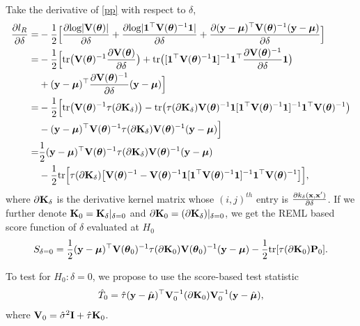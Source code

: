 \documentclass[article]{jss}
\begin{document}
\begin{appendix}
Take the derivative of \eqref{pp} with respect to $\delta$,
\begin{align}
\frac{\partial l_R}{\partial \delta}=&-\frac{1}{2}\Big[\frac{\partial \mbox{log}| {\bf V}(\boldsymbol{\theta}) |}{\partial \delta}+\frac{\partial \mbox{log} | \mathbf{1}^\top {\bf V}(\boldsymbol{\theta})^{-1}\mathbf{1} |}{\partial \delta}+ \frac{\partial ({\bf y}-\boldsymbol{\mu})^\top {\bf V}(\boldsymbol{\theta})^{-1}({\bf y}-\boldsymbol{\mu})}{\partial \delta}\Big]\nonumber \\
=&-\frac{1}{2}\Big[\mbox{tr}\big({\bf V}(\boldsymbol{\theta})^{-1}\frac{\partial {\bf V}(\boldsymbol{\theta})}{\partial \delta}\big)+\mbox{tr}\big([\mathbf{1}^\top {\bf V}(\boldsymbol{\theta})^{-1}\mathbf{1}]^{-1}\mathbf{1}^\top \frac{\partial {\bf V}(\boldsymbol{\theta})^{-1}}{\partial \delta}\mathbf{1}\big)\nonumber \\
&+({\bf y}-\boldsymbol{\mu})^\top \frac{\partial {\bf V}(\boldsymbol{\theta})^{-1}}{\partial \delta}({\bf y}-\boldsymbol{\mu}) \Big]\nonumber \\
=&-\frac{1}{2}\Big[\mbox{tr}\big({\bf V}(\boldsymbol{\theta})^{-1}\tau (\partial {\bf K}_\delta)\big)-\mbox{tr}\big(\tau (\partial {\bf K}_\delta){\bf V}(\boldsymbol{\theta})^{-1}\mathbf{1}[\mathbf{1}^\top {\bf V}(\boldsymbol{\theta})^{-1}\mathbf{1}]^{-1}\mathbf{1}^\top {\bf V}(\boldsymbol{\theta})^{-1}\big)\nonumber \\
&-({\bf y}-\boldsymbol{\mu})^\top {\bf V}(\boldsymbol{\theta})^{-1}\tau (\partial {\bf K}_\delta){\bf V}(\boldsymbol{\theta})^{-1}({\bf y}-\boldsymbol{\mu}) \Big]\nonumber \\
=&\frac{1}{2}({\bf y}-\boldsymbol{\mu})^\top {\bf V}(\boldsymbol{\theta})^{-1}\tau (\partial {\bf K}_\delta){\bf V}(\boldsymbol{\theta})^{-1}({\bf y}-\boldsymbol{\mu})\nonumber \\
&-\frac{1}{2}\mbox{tr}\Big[\tau (\partial {\bf K}_\delta)\big[{\bf V}(\boldsymbol{\theta})^{-1}-{\bf V}(\boldsymbol{\theta})^{-1}\mathbf{1}[\mathbf{1}^\top {\bf V}(\boldsymbol{\theta})^{-1}\mathbf{1} ]^{-1}\mathbf{1}^\top {\bf V}(\boldsymbol{\theta})^{-1}\big]\Big], \label{qq}
\end{align}
where $\partial {\bf K}_\delta$ is the derivative kernel matrix whose $(i,j)^{th}$ entry is $\frac{\partial k_\delta({\bf x}, {\bf x}')}{\partial \delta}$. If we further denote ${\bf K}_0={\bf K}_\delta |_{\delta=0}$ and $\partial {\bf K}_0=(\partial {\bf K}_\delta)|_{\delta=0}$, we get the REML based score function of $\delta$ evaluated at $H_0$
\begin{align*}
S_{\delta=0}=\frac{1}{2}({\bf y}-\boldsymbol{\mu})^\top {\bf V}(\boldsymbol{\theta}_0)^{-1}\tau (\partial {\bf K}_0){\bf V}(\boldsymbol{\theta}_0)^{-1}({\bf y}-\boldsymbol{\mu})-\frac{1}{2}\mbox{tr}[\tau (\partial {\bf K}_0){\bf P}_0].
\end{align*}

To test for $H_0: \delta=0$, we propose to use the score-based test statistic
\begin{align}
\hat{T}_0=\hat{\tau}({\bf y}-\hat{\boldsymbol{\mu}})^\top {\bf V}_0^{-1} (\partial {\bf K}_0){\bf V}_0^{-1}({\bf y}-\hat{\boldsymbol{\mu}}),
\end{align}
where ${\bf V}_0=\hat{\sigma}^2{\bf I}+\hat{\tau}{\bf K}_0$.



\end{appendix}
\end{document}
